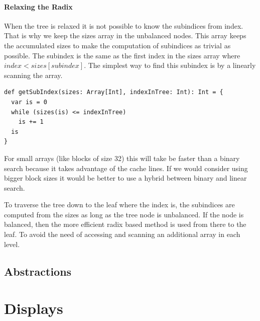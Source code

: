 \paragraph{Relaxing the Radix}
When the tree is relaxed it is not possible to know the subindices from index. That is why we keep the sizes array in the unbalanced nodes. This array keeps the accumulated sizes to make the computation of subindices as trivial as possible. The subindex is the same as the first index in the sizes array where $index < sizes[subindex]$. The simplest way to find this subindex is by a linearly scanning the array. 

\begin{lstlisting}[frame=single]
def getSubIndex(sizes: Array[Int], indexInTree: Int): Int = {
  var is = 0
  while (sizes(is) <= indexInTree)
    is += 1
  is
}
\end{lstlisting}

For small arrays (like blocks of size 32) this will take be faster than a binary search because it takes advantage of the cache lines. If we would consider using bigger block sizes it would be better to use a hybrid between binary and linear search.

To traverse the tree down to the leaf where the index is, the subindices are computed from the sizes as long as the tree node is unbalanced. If the node is balanced, then the more efficient radix based method is used from there to the leaf. To avoid the need of accessing and scanning an additional array in each level.



\subsection{Abstractions}



\section{Displays}

